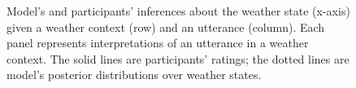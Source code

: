 \documentclass[10pt,letterpaper]{article}
\begin{document}
%

\begin{figure}[t]
\caption{Model's and participants' inferences about the weather state (x-axis) given a weather context (row) and an utterance (column). Each panel represents interpretations of an utterance in a weather context. The solid lines are participants' ratings; the dotted lines are model's posterior distributions over weather states.}
\label{model-state}
\end{figure}
\end{document}
